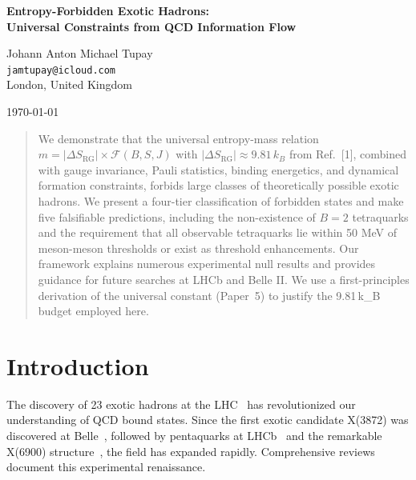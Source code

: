 \documentclass[12pt,a4paper]{article}
\begin{document}
\thispagestyle{empty}

\begin{center}
{\LARGE \textbf{Entropy-Forbidden Exotic Hadrons:\\[0.3em] Universal Constraints from QCD Information Flow}}

\vspace{1em}

{\large Johann Anton Michael Tupay}\\
\texttt{jamtupay@icloud.com}\\
London, United Kingdom

\vspace{1em}
{\large \today}
\end{center}

\vspace{1em}

\begin{abstract}
We demonstrate that the universal entropy-mass relation $m = |\Delta S_{\text{RG}}| \times \mathcal{F}(B,S,J)$ with $|\Delta S_{\text{RG}}| \approx 9.81\,k_B$ from Ref.~[1], combined with gauge invariance, Pauli statistics, binding energetics, and dynamical formation constraints, forbids large classes of theoretically possible exotic hadrons. We present a four-tier classification of forbidden states and make five falsifiable predictions, including the non-existence of $B=2$ tetraquarks and the requirement that all observable tetraquarks lie within 50 MeV of meson-meson thresholds or exist as threshold enhancements. Our framework explains numerous experimental null results and provides guidance for future searches at LHCb and Belle II. We use a first-principles derivation of the universal constant (Paper~5) to justify the 9.81\,k_B budget employed here.
\end{abstract}

\newpage
\setcounter{page}{1}
\pagestyle{fancy}

\section{Introduction}

The discovery of 23 exotic hadrons at the LHC~\cite{LHCb2022,CERN2024} has revolutionized our understanding of QCD bound states. Since the first exotic candidate X(3872) was discovered at Belle~\cite{Belle2003}, followed by pentaquarks at LHCb~\cite{LHCb2019} and the remarkable X(6900) structure~\cite{LHCb2020}, the field has expanded rapidly. Comprehensive reviews~\cite{Brambilla2020,Esposito2017,Ali2017} document this experimental renaissance. 
\end{document}
